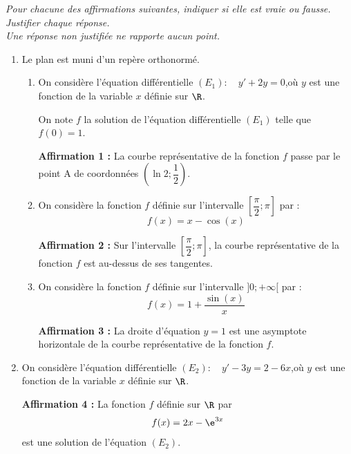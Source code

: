 \emph{Pour chacune des affirmations suivantes, indiquer si elle est vraie ou    fausse.\\
	Justifier chaque réponse.\\
	Une réponse non justifiée ne rapporte aucun point.}

	\begin{enumerate}
		\item Le plan est muni d'un repère orthonormé.
		\begin{enumerate}
			\item On considère l'équation différentielle \quad $\left(E_{1}\right): \quad y'+2 y=0$,\quad où $y$ est une fonction de la variable $x$ définie sur $\R$.

			On note $f$ la solution de l'équation différentielle $(E_{1})$ telle que $f(0)=1$.

			\textbf{Affirmation 1 :} La courbe représentative de la fonction $f$ passe par le point A de coordonnées $\left(\ln 2 ; \dfrac{1}{2}\right)$.

			\item On considère la fonction $f$ définie sur l'intervalle $\left[\dfrac{\pi}{2} ; \pi\right]$ par :
			\[f(x)=x-\cos (x)\]

			\textbf{Affirmation 2 :} Sur l'intervalle $\left[\dfrac{\pi}{2} ; \pi\right]$, la courbe représentative de la fonction $f$ est au-dessus de ses tangentes.

			\item On considère la fonction $f$ définie sur l'intervalle $] 0 ;+\infty[$ par :
			\[f(x)=1+\dfrac{\sin (x)}{x}\]

			\textbf{Affirmation 3 :} La droite d'équation $y=1$ est une asymptote horizontale de la courbe représentative de la fonction $f$.
		\end{enumerate}

		\item On considère l'équation différentielle \quad $\left(E_{2}\right): \quad y'-3 y=2-6 x$,\quad où $y$ est une fonction de la variable $x$ définie sur $\R$.

		\textbf{Affirmation 4 :} La fonction $f$ définie sur $\R$ par
		\[f(x)=2 x-\e^{3 x}\]
		est une solution de l'équation $(E_{2})$.
	\end{enumerate}

